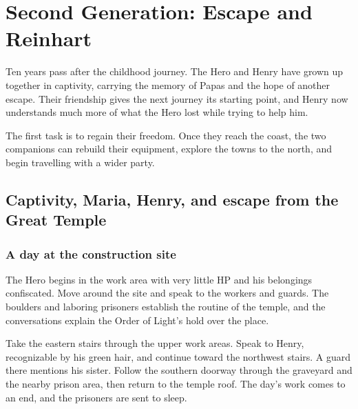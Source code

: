 \chapter{Second Generation: Escape and Reinhart}
\label{written-escape}


Ten years pass after the childhood journey. The Hero and Henry have
grown up together in captivity, carrying the memory of Papas and the
hope of another escape. Their friendship gives the next journey its
starting point, and Henry now understands much more of what the Hero
lost while trying to help him.


The first task is to regain their freedom. Once they reach the coast,
the two companions can rebuild their equipment, explore the towns to
the north, and begin travelling with a wider party.

\section{Captivity, Maria, Henry, and escape from the Great Temple}

\subsection*{A day at the construction site}

The Hero begins in the work area with very little HP and his belongings
confiscated. Move around the site and speak to the workers and guards.
The boulders and laboring prisoners establish the routine of the temple,
and the conversations explain the Order of Light's hold over the place.

Take the eastern stairs through the upper work areas. Speak to Henry,
recognizable by his green hair, and continue toward the northwest stairs.
A guard there mentions his sister. Follow the southern doorway through
the graveyard and the nearby prison area, then return to the temple roof.
The day's work comes to an end, and the prisoners are sent to sleep.

